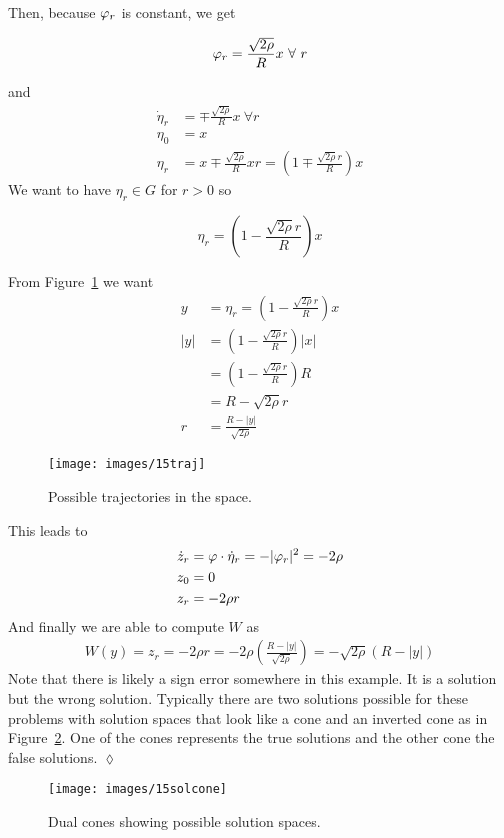 \begin{example}
Then, because $\varphi_r$ is constant, we get

\begin{equation*}
\varphi_r = \frac{\sqrt{2\rho}}{R}x~\forall~r
\end{equation*}

and
\begin{align*}
\dot{\eta}_r &= \mp \frac{\sqrt{2\rho}}{R}x~\forall r \\
\eta_0 &= x \\
\eta_r &= x\mp\frac{\sqrt{2\rho}}{R}xr = \left(1\mp\frac{\sqrt{2\rho}r}{R}\right)x
\end{align*}
We want to have $\eta_r\in G$ for $r>0$ so

\begin{equation*}
\eta_r = \left(1-\frac{\sqrt{2\rho}r}{R}\right)x
\end{equation*}

From Figure~\ref{fig:15traj} we want
\begin{align*}
y &= \eta_r = \left(1-\frac{\sqrt{2\rho}r}{R}\right)x \\
|y| &= \left(1-\frac{\sqrt{2\rho}r}{R}\right)|x| \\
&= \left(1-\frac{\sqrt{2\rho}r}{R}\right)R \\
&= R-\sqrt{2\rho}r \\
r &= \frac{R-|y|}{\sqrt{2\rho}}
\end{align*}

\begin{figure}[ht!]
\centering
\texttt{[image: images/15traj]}
\caption{Possible trajectories in the space.}%
\label{fig:15traj}
\end{figure}

This leads to
\begin{align*}
\dot{z}_r &= \varphi\cdot\dot{\eta}_r = -|\varphi_r|^2 = -2\rho \\
z_0 &= 0 \\
z_r &= -2\rho r
\end{align*}
And finally we are able to compute $W$ as
\begin{align*}
\boxed{W(y) = z_r = -2\rho r = -2\rho\left(\frac{R-|y|}{\sqrt{2\rho}}\right) = -\sqrt{2\rho}(R-|y|)}
\end{align*}
Note that there is likely a sign error somewhere in this example.
It is a solution but the wrong solution.
Typically there are two solutions possible for these problems with solution spaces that look like a cone and an inverted cone as in Figure~\ref{fig:15solcone}.
One of the cones represents the true solutions and the other cone the false solutions.
$\lozenge$
\end{example}

\begin{figure}[ht!]
\centering
\texttt{[image: images/15solcone]}
\caption{Dual cones showing possible solution spaces.}%
\label{fig:15solcone}
\end{figure}%
